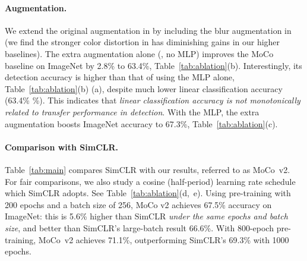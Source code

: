 \documentclass[10pt,twocolumn,letterpaper]{article}
\begin{document}
\paragraph{Augmentation.} We extend the original augmentation in \cite{He2019a} by including the blur augmentation in \cite{Chen2020} (we find the stronger color distortion in \cite{Chen2020} has diminishing gains in our higher baselines).
The extra augmentation alone (\ie, no MLP) improves the MoCo baseline on ImageNet by 2.8\% to 63.4\%, Table~\ref{tab:ablation}(b).
Interestingly, its detection accuracy is higher than that of using the MLP alone, Table~\ref{tab:ablation}(b) \vs (a), despite much lower linear classification accuracy (63.4\% \%). This indicates that {\emph{linear classification accuracy is not monotonically related to transfer performance in detection}}.
With the MLP, the extra augmentation boosts ImageNet accuracy to 67.3\%, Table~\ref{tab:ablation}(c). 

\paragraph{Comparison with SimCLR.} Table~\ref{tab:main} compares SimCLR \cite{Chen2020} with
our results, referred to as MoCo~v2.
For fair comparisons, we also study a cosine (half-period) learning rate schedule \cite{Loshchilov2016} which SimCLR adopts. See Table~\ref{tab:ablation}\mbox{(d, e)}.
Using pre-training with 200 epochs and a batch size of 256, MoCo v2 achieves 67.5\% accuracy on ImageNet: this is 5.6\% higher than SimCLR \emph{under the same epochs and batch size}, and better than SimCLR's large-batch result 66.6\%. With 800-epoch pre-training, \mbox{MoCo~v2} achieves 71.1\%, outperforming SimCLR's 69.3\% with 1000 epochs.
\end{document}
